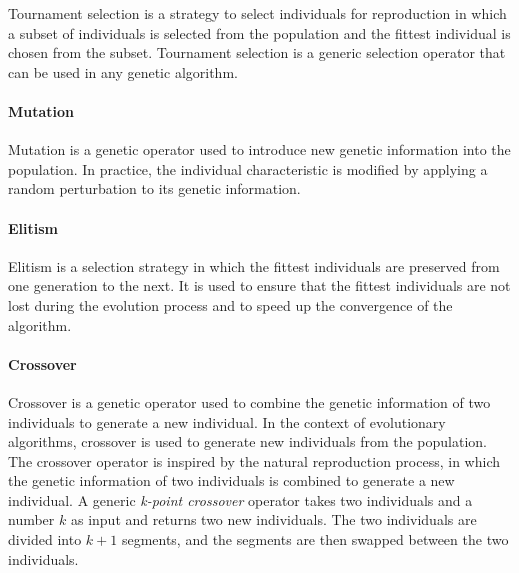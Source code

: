 Tournament selection is a strategy to select individuals for reproduction in which a subset of individuals is selected from the population and the fittest individual is chosen from the subset. Tournament selection is a generic selection operator that can be used in any genetic algorithm.

\paragraph{Mutation}

Mutation is a genetic operator used to introduce new genetic information into the population. In practice, the individual characteristic is modified by applying a random perturbation to its genetic information.

\paragraph{Elitism}

Elitism is a selection strategy in which the fittest individuals are preserved from one generation to the next. It is used to ensure that the fittest individuals are not lost during the evolution process and to speed up the convergence of the algorithm.

\paragraph{Crossover}

Crossover is a genetic operator used to combine the genetic information of two individuals to generate a new individual. In the context of evolutionary algorithms, crossover is used to generate new individuals from the population. The crossover operator is inspired by the natural reproduction process, in which the genetic information of two individuals is combined to generate a new individual. A generic \textit{k-point crossover} operator takes two individuals and a number $k$ as input and returns two new individuals. The two individuals are divided into $k+1$ segments, and the segments are then swapped between the two individuals.
